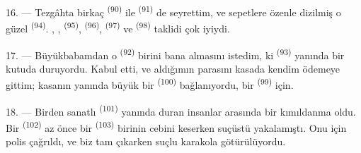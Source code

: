 16. --- Tezgâhta birkaç  \textsuperscript{(90)} ile
 \textsuperscript{(91)} de seyrettim, ve sepetlere
özenle dizilmiş o güzel  \textsuperscript{(94)}.
, , 
\textsuperscript{(95)},  \textsuperscript{(96)},
 \textsuperscript{(97)} ve 
\textsuperscript{(98)} taklidi çok iyiydi.

\VUsaut{4.4mm}
\VUsaut{2.8mm}

17. --- Büyükbabamdan o  \textsuperscript{(92)}
birini bana almasını istedim, ki 
\textsuperscript{(93)} yanında bir kutuda duruyordu. Kabul etti, ve aldığımın parasını kasada kendim ödemeye
gittim; kasanın yanında büyük bir  \textsuperscript{(100)}
bağlanıyordu, bir  \textsuperscript{(99)} için.

18. --- Birden sanatlı  \textsuperscript{(101)}
yanında duran insanlar arasında bir kımıldanma oldu. Bir 
\textsuperscript{(102)} az önce bir 
\textsuperscript{(103)} birinin cebini keserken suçüstü yakalamıştı. Onu
 için polis çağrıldı, ve biz tam çıkarken suçlu karakola
götürülüyordu.
\VUsaut{6.0mm}
\VUfilet{22mm}
